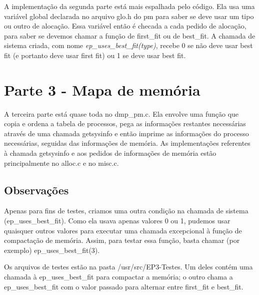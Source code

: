 \documentclass[11pt]{article}
\begin{document}
    A implementação da segunda parte está mais espalhada pelo código. Ela usa uma variável global declarada no arquivo glo.h do pm para saber se deve usar um tipo ou outro de alocação. Essa variável então é checada a cada pedido de alocação, para saber se devemos chamar a função de first\_fit ou de best\_fit. A chamada de sistema criada, com nome \textit{ep\_uses\_best\_fit(type)}, recebe 0 se não deve usar best fit (e portanto deve usar first fit) ou 1 se deve usar best fit.

    \section*{Parte 3 - Mapa de memória}

    A terceira parte está quase toda no dmp\_pm.c. Ela envolve uma função que copia e ordena a tabela de processos, pega as informações restantes necessárias através de uma chamada getsysinfo e então imprime as informações do processo necessárias, seguidas das informações de memória. As implementações referentes à chamada getsysinfo e aos pedidos de informações de memória estão principalmente no alloc.c e no misc.c.


    \subsection*{Observações}
    Apenas para fins de testes, criamos uma outra condição na chamada de sistema (ep\_uses\_best\_fit). Como ela usava apenas valores 0 ou 1, pudemos usar quaisquer outros valores para executar uma chamada excepcional à função de compactação de memória. Assim, para testar essa função, basta chamar (por exemplo) ep\_uses\_best\_fit(3).

    Os arquivos de testes estão na pasta /usr/src/EP3-Testes. Um deles contém uma chamada à ep\_uses\_best\_fit para compactar a memória; o outro chama a ep\_uses\_best\_fit com o valor passado para alternar entre first\_fit e best\_fit.
\end{document}
